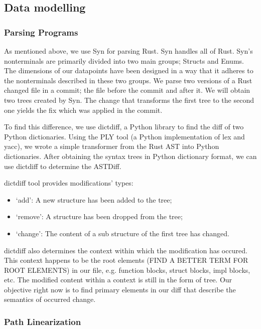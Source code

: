 \subsection{Data modelling}

\subsubsection{Parsing Programs}

As mentioned above, we use Syn for parsing Rust. Syn handles all of Rust. Syn's nonterminals are primarily divided into two main groups; Structs and Enums. The dimensions of our datapoints have been designed in a way that it adheres to the nonterminals described in these two groups. We parse two versions of a Rust changed file in a commit; the file before the commit and after it. We will obtain two trees created by Syn. The change that transforms the first tree to the second one yields the fix which was applied in the commit. 

To find this difference, we use dictdiff, a Python library to find the diff of two Python dictionaries. Using the PLY tool (a Python implementation of lex and yacc), we wrote a simple transformer from the Rust AST into Python dictionaries. After obtaining the syntax trees in Python dictionary format, we can use dictdiff to determine the ASTDiff. 

dictdiff tool provides modifications' types: 
\begin{itemize}
\item `add': A new structure has been added to the tree; 
\item `remove': A structure has been dropped from the tree; 
\item `change': The content of a sub structure of the first tree has changed.
\end{itemize}
dictdiff also determines the context within which the modification has occured. This context happens to be the root elements (FIND A BETTER TERM FOR ROOT ELEMENTS) in our file, e.g. function blocks, struct blocks, impl blocks, etc. The modified content within a context is still in the form of tree. Our objective right now is to find primary elements in our diff that describe the semantics of occurred change.

\subsubsection{Path Linearization}

